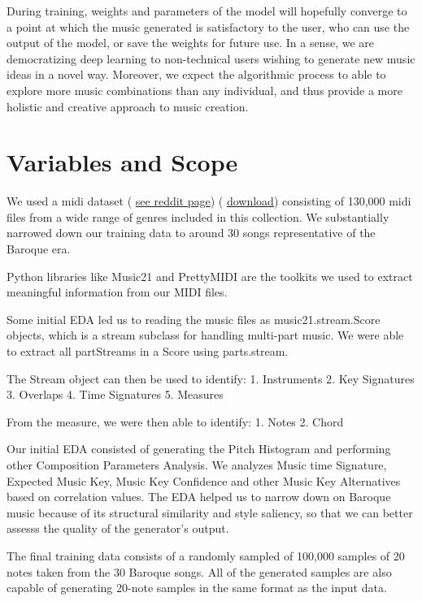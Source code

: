 \documentclass[12pt,oneside]{chicagocapstone}
\begin{document}
During training, weights and parameters of the model will hopefully converge to a point at which the music generated is satisfactory to the user, who can use the output of the model, or save the weights for future use. In a sense, we are democratizing deep learning to non-technical users wishing to generate new music ideas in a novel way. Moreover, we expect the algorithmic process to able to explore more music combinations than any individual, and thus provide a more holistic and creative approach to music creation.

\hypertarget{variables-and-scope}{%
\section*{Variables and Scope}\label{variables-and-scope}}

We used a midi dataset ( \href{https://www.reddit.com/r/WeAreTheMusicMakers/comments/3ajwe4/the_largest_midi_collection_on_the_internet/}{see reddit page}) ( \href{https://mega.co.nz/\#!Elg1TA7T!MXEZPzq9s9YObiUcMCoNQJmCbawZqzAkHzY4Ym6Gs_Q}{download}) consisting of 130,000 midi files from a wide range of genres included in this collection. We substantially narrowed down our training data to around 30 songs representative of the Baroque era.

Python libraries like Music21 and PrettyMIDI are the toolkits we used to extract meaningful information from our MIDI files.

Some initial EDA led us to reading the music files as music21.stream.Score objects, which is a stream subclass for handling multi-part music. We were able to extract all partStreams in a Score using parts.stream.

The Stream object can then be used to identify:
1. Instruments
2. Key Signatures
3. Overlaps
4. Time Signatures
5. Measures

From the measure, we were then able to identify:
1. Notes
2. Chord

Our initial EDA consisted of generating the Pitch Histogram and performing other Composition Parameters Analysis. We analyzes Music time Signature, Expected Music Key, Music Key Confidence and other Music Key Alternatives based on correlation values. The EDA helped us to narrow down on Baroque music because of its structural similarity and style saliency, so that we can better assesss the quality of the generator's output.

The final training data consists of a randomly sampled of 100,000 samples of 20 notes taken from the 30 Baroque songs. All of the generated samples are also capable of generating 20-note samples in the same format as the input data.
\end{document}
